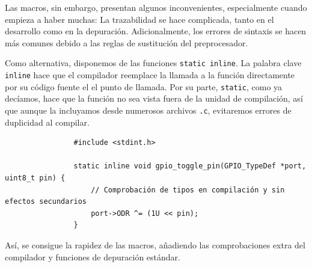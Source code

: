 \documentclass[../main.tex]{subfiles}
\begin{document}
            Las macros, sin embargo, presentan algunos inconvenientes, especialmente cuando empieza a haber muchas: La trazabilidad se hace complicada, tanto en el desarrollo como en la depuración. Adicionalmente, los errores de sintaxis se hacen más comunes debido a las reglas de sustitución del preprocesador.

            Como alternativa, disponemos de las funciones \lstinline|static inline|. La palabra clave \lstinline|inline| hace que el compilador reemplace la llamada a la función directamente por su código fuente el el punto de llamada. Por su parte, \lstinline|static|, como ya decíamos, hace que la función no sea vista fuera de la unidad de compilación, así que aunque la incluyamos desde numerosos archivos \texttt{.c}, evitaremos errores de duplicidad al compilar.

            \begin{lstlisting}
                #include <stdint.h>

                static inline void gpio_toggle_pin(GPIO_TypeDef *port, uint8_t pin) {
                    // Comprobación de tipos en compilación y sin efectos secundarios
                    port->ODR ^= (1U << pin); 
                }
            \end{lstlisting}

            Así, se consigue la rapidez de las macros, añadiendo las comprobaciones extra del compilador y funciones de depuración estándar.
\end{document}
